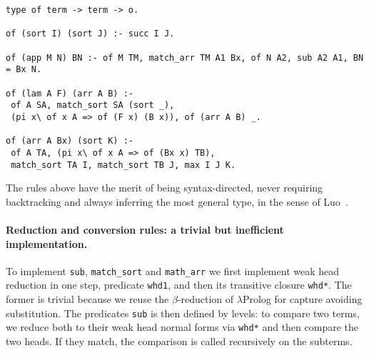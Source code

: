 \documentclass{easychair}
\begin{document}
\begin{Verbatim}
type of term -> term -> o.

of (sort I) (sort J) :- succ I J.

of (app M N) BN :- of M TM, match_arr TM A1 Bx, of N A2, sub A2 A1, BN = Bx N.

of (lam A F) (arr A B) :-
 of A SA, match_sort SA (sort _),
 (pi x\ of x A => of (F x) (B x)), of (arr A B) _.

of (arr A Bx) (sort K) :-
 of A TA, (pi x\ of x A => of (Bx x) TB),
 match_sort TA I, match_sort TB J, max I J K.
\end{Verbatim}

The rules above have the merit of being syntax-directed, never requiring backtracking and always inferring the most general type, in the sense of Luo~\cite{ecc}.
% 
% 
% 

\paragraph{Reduction and conversion rules: a trivial but inefficient implementation. }\label{sec:inefficient}
To implement \verb+sub+, \verb+match_sort+ and
\verb+math_arr+ we first implement weak head
reduction in one step, predicate \verb+whd1+, and then 
its transitive closure \verb+whd*+.
The former is trivial because we reuse the $\beta$-reduction of $\lambda$Prolog for capture avoiding substitution. The predicates \verb+sub+ is then defined by levels: to compare two terms, we reduce both to their weak head normal forms via \verb+whd*+ and then compare the two heads. If they match, the comparison is called recursively on the subterms.
\end{document}
